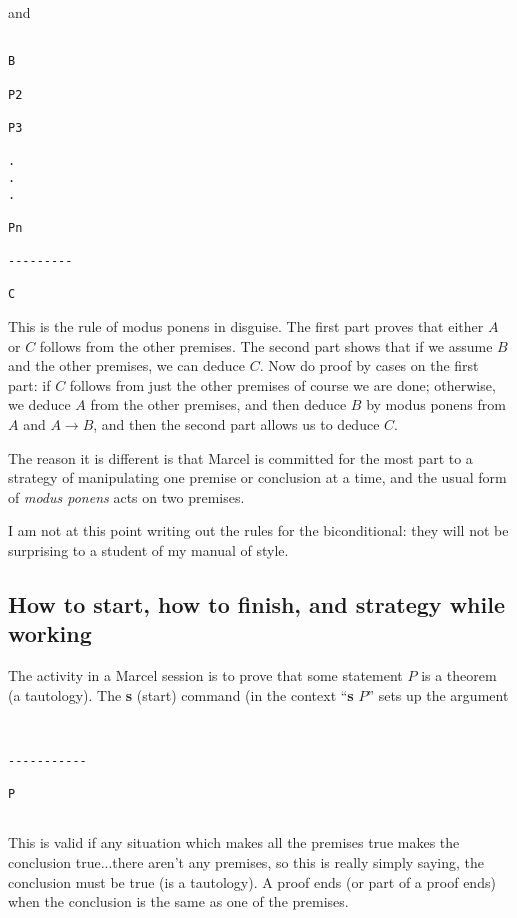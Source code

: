 \documentclass[12pt]{article}
\begin{document}
and 

{\small \begin{verbatim}

B

P2

P3

.
.
.

Pn

---------

C

\end{verbatim}}

This is the rule of modus ponens in disguise.  The first part proves that either $A$ or $C$ follows from the
other premises.  The second part shows that if we assume $B$ and the other premises, we can deduce $C$.
Now do proof by cases on the first part:  if $C$ follows from just the other premises of course we are done;
otherwise, we deduce $A$ from the other premises, and then deduce $B$ by modus ponens from
$A$ and $A \rightarrow B$, and then the second part allows us to deduce $C$.

The reason it is different is that Marcel is committed for the most part to a strategy of manipulating one premise or conclusion at a time, and the usual form of {\em modus ponens\/} acts on two premises.

I am not at this point writing out the rules for the biconditional:  they will not be surprising to a student of my manual of style.

\subsection{How to start, how to finish, and strategy while working}

The activity in a Marcel session is to prove that some statement $P$ is a theorem (a tautology).  The {\bf s} (start) command (in the context ``{\bf s} $P$'' sets up the argument

\begin{verbatim}


-----------

P


\end{verbatim}

This is valid if any situation which makes all the premises true makes the conclusion true...there aren't any premises, so this is really simply saying, the conclusion must be true (is a tautology).
\newpage
A proof ends (or part of a proof ends) when the conclusion is the same as one of the premises.
\end{document}

